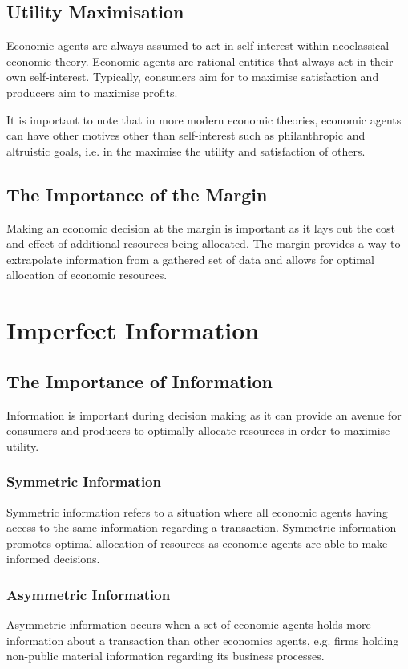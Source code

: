 \documentclass[a4paper,10pt]{article}
\begin{document}
\begin{multicols*}{2}
	\subsection{Utility Maximisation}
	Economic agents are always assumed to act in self-interest within neoclassical economic theory. Economic agents are rational entities that always act in their own self-interest. Typically, consumers aim for to maximise satisfaction and producers aim to maximise profits.
	\medskip

	It is important to note that in more modern economic theories, economic agents can have other motives other than self-interest such as philanthropic and altruistic goals, i.e. in the maximise the utility and satisfaction of others.


	\subsection{The Importance of the Margin}
	Making an economic decision at the margin is important as it lays out the cost and effect of additional resources being allocated. The margin provides a way to extrapolate information from a gathered set of data and allows for optimal allocation of economic resources.

	\section{Imperfect Information}
	\subsection{The Importance of Information}
	Information is important during decision making as it can provide an avenue for consumers and producers to optimally allocate resources in order to maximise utility.

	\subsubsection{Symmetric Information}
	Symmetric information refers to a situation where all economic agents having access to the same information regarding a transaction. Symmetric information promotes optimal allocation of resources as economic agents are able to make informed decisions.

	\subsubsection{Asymmetric Information}
	Asymmetric information occurs when a set of economic agents holds more information about a transaction than other economics agents, e.g. firms holding non-public material information regarding its business processes.


\end{multicols*}
\end{document}
